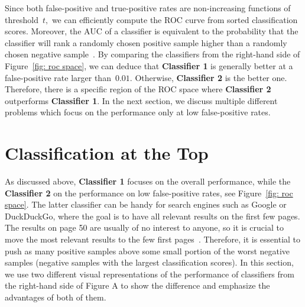 Since both false-positive and true-positive rates are non-increasing functions of threshold~$t,$ we can efficiently compute the ROC curve from sorted classification scores. Moreover, the AUC of a classifier is equivalent to the probability that the classifier will rank a randomly chosen positive sample higher than a randomly chosen negative sample~\cite{fawcett2006introduction}. By comparing the classifiers from the right-hand side of Figure~\ref{fig: roc space}, we can deduce that \textbf{Classifier 1} is generally better at a false-positive rate larger than~$0.01.$ Otherwise, \textbf{Classifier 2} is the better one. Therefore,  there is a specific region of the ROC space where \textbf{Classifier 2} outperforms \textbf{Classifier 1}. In the next section, we discuss multiple different problems which focus on the performance only at low false-positive rates.

\section{Classification at the Top}\label{sec: related problems}

As discussed above, \textbf{Classifier 1} focuses on the overall performance, while the  \textbf{Classifier 2} on the performance on low false-positive rates, see Figure~\ref{fig: roc space}. The latter classifier can be handy for search engines such as Google or DuckDuckGo, where the goal is to have all relevant results on the first few pages. The results on page 50 are usually of no interest to anyone, so it is crucial to move the most relevant results to the few first pages~\cite{cortes2003auc}. Therefore, it is essential to push as many positive samples above some small portion of the worst negative samples (negative samples with the largest classification scores). In this section, we use two different visual representations of the performance of classifiers from the right-hand side of Figure A to show the difference and emphasize the advantages of both of them.

